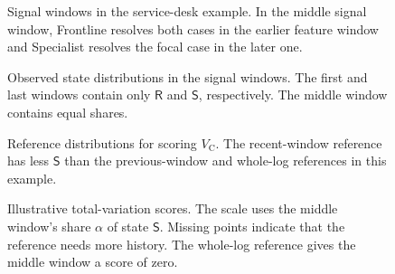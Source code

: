 \begin{figure}[!t]
  \centering
  
  \caption{Signal windows in the service-desk example. In the middle signal window, Frontline resolves both cases in the earlier feature window and Specialist resolves the focal case in the later one.}
  \label{fig:approach-signal-windows}
\end{figure}

\begin{figure}[!t]
  \centering
  
  \caption{Observed state distributions in the signal windows. The first and last windows contain only $\mathsf R$ and $\mathsf S$, respectively. The middle window contains equal shares.}
  \label{fig:approach-state-distributions}
\end{figure}

\begin{figure}[!t]
  \centering
  
  \caption{Reference distributions for scoring $V_{\mathrm C}$. The recent-window reference has less $\mathsf S$ than the previous-window and whole-log references in this example.}
  \label{fig:approach-reference-distributions}
\end{figure}

\begin{figure}[!t]
  \centering
  
  \caption{Illustrative total-variation scores. The scale uses the middle window's share $\alpha$ of state $\mathsf S$. Missing points indicate that the reference needs more history. The whole-log reference gives the middle window a score of zero.}
  \label{fig:approach-drift-scores}
\end{figure}
